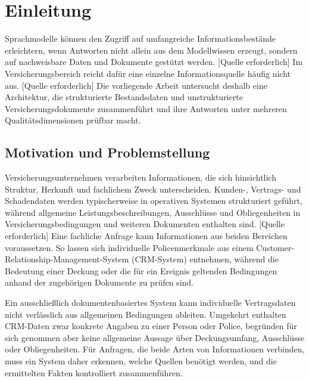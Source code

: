 
\chapter{Einleitung}

Sprachmodelle können den Zugriff auf umfangreiche Informationsbestände erleichtern, wenn Antworten nicht allein aus dem Modellwissen erzeugt, sondern auf nachweisbare Daten und Dokumente gestützt werden. [Quelle erforderlich] Im Versicherungsbereich reicht dafür eine einzelne Informationsquelle häufig nicht aus. [Quelle erforderlich] Die vorliegende Arbeit untersucht deshalb eine Architektur, die strukturierte Bestandsdaten und unstrukturierte Versicherungsdokumente zusammenführt und ihre Antworten unter mehreren Qualitätsdimensionen prüfbar macht.

\section{Motivation und Problemstellung}

Versicherungsunternehmen verarbeiten Informationen, die sich hinsichtlich Struktur, Herkunft und fachlichem Zweck unterscheiden. Kunden-, Vertrags- und Schadendaten werden typischerweise in operativen Systemen strukturiert geführt, während allgemeine Leistungsbeschreibungen, Ausschlüsse und Obliegenheiten in Versicherungsbedingungen und weiteren Dokumenten enthalten sind. [Quelle erforderlich] Eine fachliche Anfrage kann Informationen aus beiden Bereichen voraussetzen. So lassen sich individuelle Policenmerkmale aus einem Customer-Relationship-Management-System (CRM-System) entnehmen, während die Bedeutung einer Deckung oder die für ein Ereignis geltenden Bedingungen anhand der zugehörigen Dokumente zu prüfen sind.

Ein ausschließlich dokumentenbasiertes System kann individuelle Vertragsdaten nicht verlässlich aus allgemeinen Bedingungen ableiten. Umgekehrt enthalten CRM-Daten zwar konkrete Angaben zu einer Person oder Police, begründen für sich genommen aber keine allgemeine Aussage über Deckungsumfang, Ausschlüsse oder Obliegenheiten. Für Anfragen, die beide Arten von Informationen verbinden, muss ein System daher erkennen, welche Quellen benötigt werden, und die ermittelten Fakten kontrolliert zusammenführen.

